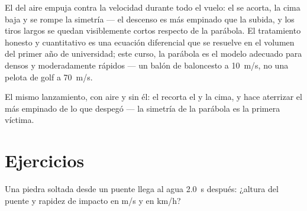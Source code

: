 \begin{remark}\label{rem:g12:projectile-motion:drag}
El  del aire empuja contra la velocidad durante todo el vuelo: el  se
acorta, la cima baja y se rompe la simetría --- el descenso es más empinado que la
subida, y los tiros largos se quedan visiblemente cortos respecto de la parábola. El
tratamiento honesto y cuantitativo es una ecuación diferencial que se resuelve en el
volumen del primer año de universidad; este curso, la parábola es el modelo adecuado
para  densos y moderadamente rápidos --- un balón de baloncesto a
\qty{10}{m/s}, no una pelota de golf a \qty{70}{m/s}.
\end{remark}

\begin{omfigure}

{\small El mismo lanzamiento, con aire y sin él: el  recorta el  y la
cima, y hace aterrizar el  más empinado de lo que despegó --- la simetría de
la parábola es la primera víctima.}
\end{omfigure}

\section{Ejercicios}

\begin{exercise}[$\star$]\label{exo:g12:projectile-motion:1}
Una piedra soltada desde un puente llega al agua \qty{2.0}{s} después: ¿altura del
puente y rapidez de impacto en \unit{m/s} y en \unit{km/h}?
\end{exercise}

